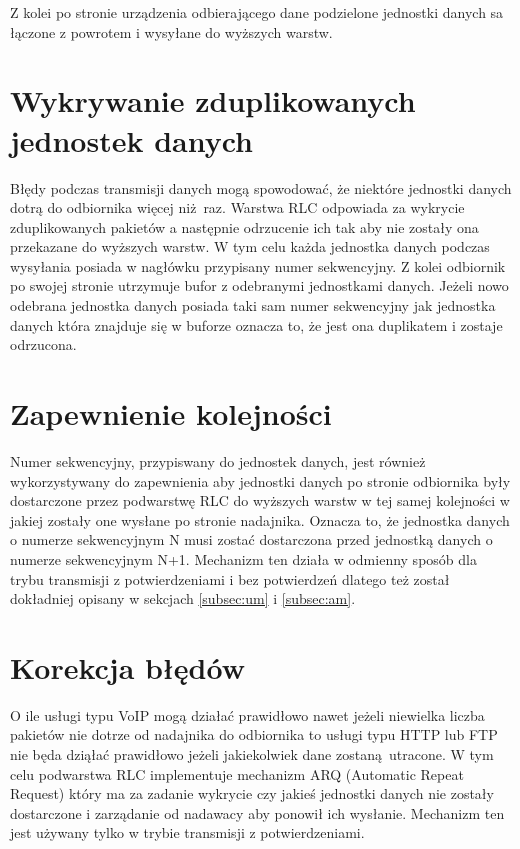 Z kolei po stronie urządzenia odbierającego dane podzielone jednostki danych sa łączone z powrotem i wysyłane do wyższych warstw.
  
\section{Wykrywanie zduplikowanych jednostek danych}

Błędy podczas transmisji danych mogą spowodować, że niektóre jednostki danych dotrą do odbiornika więcej niż raz. Warstwa RLC odpowiada za wykrycie zduplikowanych pakietów a następnie odrzucenie ich tak aby nie zostały ona przekazane do wyższych warstw. W tym celu każda jednostka danych podczas wysyłania posiada w nagłówku przypisany numer sekwencyjny. Z kolei odbiornik po swojej stronie utrzymuje bufor z odebranymi jednostkami danych. Jeżeli nowo odebrana jednostka danych posiada taki sam numer sekwencyjny jak jednostka danych która znajduje się w buforze oznacza to, że jest ona duplikatem i zostaje odrzucona.

\section{Zapewnienie kolejności}

Numer sekwencyjny, przypiswany do jednostek danych, jest również wykorzystywany do zapewnienia aby jednostki danych po stronie odbiornika były dostarczone przez podwarstwę RLC do wyższych warstw w tej samej kolejności w jakiej zostały one wysłane po stronie nadajnika. Oznacza to, że jednostka danych o numerze sekwencyjnym N musi zostać dostarczona przed jednostką danych o numerze sekwencyjnym N+1. Mechanizm ten działa w odmienny sposób dla trybu transmisji z potwierdzeniami i bez potwierdzeń dlatego też został dokładniej opisany w sekcjach \ref{subsec:um} i \ref{subsec:am}.

\section{Korekcja błędów}

O ile usługi typu VoIP mogą działać prawidłowo nawet jeżeli niewielka liczba pakietów nie dotrze od nadajnika do odbiornika to usługi typu HTTP lub FTP nie będa dziąłać prawidłowo jeżeli jakiekolwiek dane zostaną utracone. W tym celu podwarstwa RLC implementuje mechanizm ARQ (Automatic Repeat Request) który ma za zadanie wykrycie czy jakieś jednostki danych nie zostały dostarczone i zarządanie od nadawacy aby ponowił ich wysłanie. Mechanizm ten jest używany tylko w trybie transmisji z potwierdzeniami.


